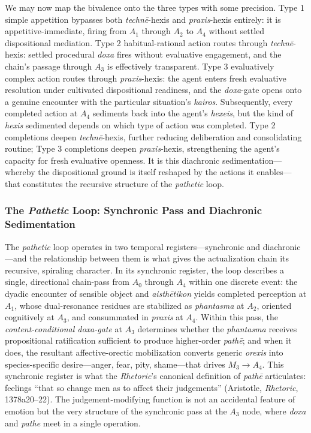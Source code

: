 \documentclass{article}
\begin{document}
We may now map the bivalence onto the three types with some precision. Type 1 simple appetition bypasses both \textit{techn\=e}-hexis and \textit{praxis}-hexis entirely: it is appetitive-immediate, firing from $A_1$ through $A_2$ to $A_4$ without settled dispositional mediation. Type 2 habitual-rational action routes through \textit{techn\=e}-hexis: settled procedural \textit{doxa} fires without evaluative engagement, and the chain's passage through $A_3$ is effectively transparent. Type 3 evaluatively complex action routes through \textit{praxis}-hexis: the agent enters fresh evaluative resolution under cultivated dispositional readiness, and the \textit{doxa}-gate opens onto a genuine encounter with the particular situation's \textit{kairos}. Subsequently, every completed action at $A_4$ sediments back into the agent's \textit{hexeis}, but the kind of \textit{hexis} sedimented depends on which type of action was completed. Type 2 completions deepen \textit{techn\=e}-hexis, further reducing deliberation and consolidating routine; Type 3 completions deepen \textit{praxis}-hexis, strengthening the agent's capacity for fresh evaluative openness. It is this diachronic sedimentation---whereby the dispositional ground is itself reshaped by the actions it enables---that constitutes the recursive structure of the \textit{pathetic} loop.


\subsubsection*{The \textit{Pathetic} Loop: Synchronic Pass and Diachronic Sedimentation}

The \textit{pathetic} loop operates in two temporal registers---synchronic and diachronic---and the relationship between them is what gives the actualization chain its recursive, spiraling character. In its synchronic register, the loop describes a single, directional chain-pass from $A_0$ through $A_4$ within one discrete event: the dyadic encounter of sensible object and \textit{aisth\=etikon} yields completed perception at $A_1$, whose dual-resonance residues are stabilized as \textit{phantasma} at $A_2$, oriented cognitively at $A_3$, and consummated in \textit{praxis} at $A_4$. Within this pass, the \textit{content-conditional doxa-gate} at $A_3$ determines whether the \textit{phantasma} receives propositional ratification sufficient to produce higher-order \textit{path\=e}; and when it does, the resultant affective-orectic mobilization converts generic \textit{orexis} into species-specific desire---anger, fear, pity, shame---that drives $M_3 \rightarrow A_4$. This synchronic register is what the \textit{Rhetoric}'s canonical definition of \textit{path\=e} articulates: feelings ``that so change men as to affect their judgements'' (Aristotle, \textit{Rhetoric}, 1378a20--22). The judgement-modifying function is not an accidental feature of emotion but the very structure of the synchronic pass at the $A_3$ node, where \textit{doxa} and \textit{pathe} meet in a single operation.
\end{document}
